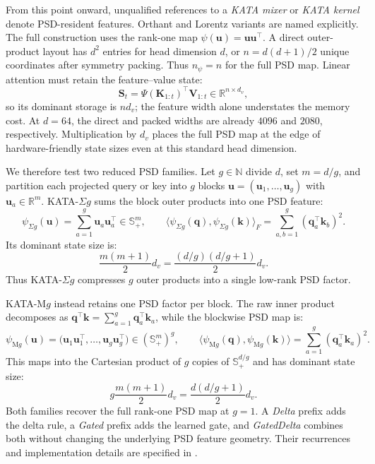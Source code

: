 \documentclass{article}
\newcommand{\1}{\bm{1}}
\newcommand{\lrangle}[1]{\langle#1\rangle}
\def\vk{{\bm{k}}}
\def\vq{{\bm{q}}}
\def\vu{{\bm{u}}}
\def\mK{{\bm{K}}}
\def\mS{{\bm{S}}}
\def\mV{{\bm{V}}}
\def\sS{{\mathbb{S}}}
\newcommand{\R}{\mathbb{R}}
\theoremstyle{definition}
\begin{document}
From this point onward, unqualified references to a \emph{KATA mixer} or \emph{KATA kernel}
denote PSD-resident features. Orthant and Lorentz variants are named explicitly. The full
construction uses the rank-one map $\psi(\vu)=\vu\vu^\top$. A direct outer-product layout has $d^2$ entries for head dimension $d$,
or $n=d(d+1)/2$ unique coordinates after symmetry packing. Thus $n_\psi=n$ for the full PSD
map. Linear attention must retain the
feature--value state:
\[
  \mS_t=\Psi(\mK_{1:t})^\top\mV_{1:t}\in\R^{n\times d_v},
\]
so its dominant storage is $n d_v$; the feature width alone understates the memory cost. At $d=64$, the direct and packed
widths are already $4096$ and $2080$, respectively. Multiplication by $d_v$ places the full PSD map
at the edge of hardware-friendly state sizes even at this standard head dimension.

We therefore test two reduced PSD families. Let $g\in\mathbb{N}$ divide $d$, set $m=d/g$, and
partition each projected query or key into $g$ blocks
$\vu=(\vu_1,\ldots,\vu_g)$ with $\vu_a\in\R^m$. KATA-$\Sigma g$ sums the block outer products
into one PSD feature:
\[
  \psi_{\Sigma g}(\vu)
  =\sum_{a=1}^{g}\vu_a\vu_a^\top\in\sS_+^m,
  \qquad
  \lrangle{\psi_{\Sigma g}(\vq),\psi_{\Sigma g}(\vk)}_F
  =\sum_{a,b=1}^{g}(\vq_a^\top\vk_b)^2.
\]
Its dominant state size is:
\[
  \frac{m(m+1)}{2}d_v
  =\frac{(d/g)(d/g+1)}{2}d_v.
\]
Thus KATA-$\Sigma g$ compresses $g$ outer products into a single low-rank PSD factor.

KATA-M$g$ instead retains one PSD factor per block. The raw inner product decomposes as
$\vq^\top\vk=\sum_{a=1}^{g}\vq_a^\top\vk_a$, while the blockwise PSD map is:
\[
  \psi_{\mathrm{M}g}(\vu)
  =\bigl(\vu_1\vu_1^\top,\ldots,\vu_g\vu_g^\top\bigr)
  \in(\sS_+^m)^g,
  \qquad
  \lrangle{\psi_{\mathrm{M}g}(\vq),\psi_{\mathrm{M}g}(\vk)}
  =\sum_{a=1}^{g}(\vq_a^\top\vk_a)^2.
\]
This maps into the Cartesian product of $g$ copies of $\sS_+^{d/g}$ and has dominant state size:
\[
  g\frac{m(m+1)}{2}d_v
  =\frac{d(d/g+1)}{2}d_v.
\]
Both families recover the full rank-one PSD map at $g=1$. A \emph{Delta} prefix adds the delta
rule, a \emph{Gated} prefix adds the learned gate, and \emph{GatedDelta} combines both without
changing the underlying PSD feature geometry. Their recurrences and implementation details are
specified in .
\end{document}

